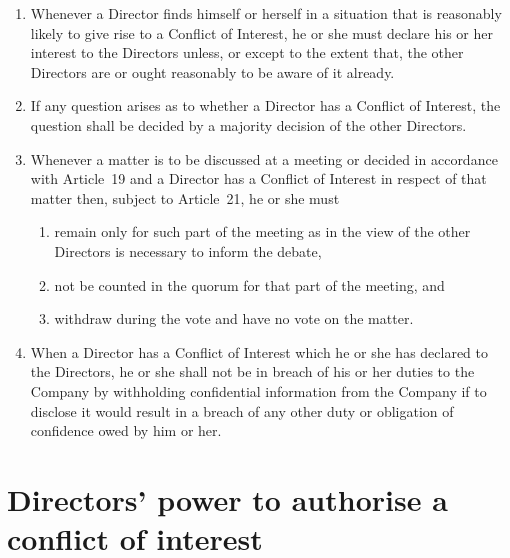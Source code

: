 \documentclass[a4paper,12pt]{article}
\begin{document}
\begin{enumerate}
  \item Whenever a Director finds himself or herself in a situation that is reasonably likely to give rise to a Conflict of Interest, he or she must declare his or her interest to the Directors unless, or except to the extent that, the other Directors are or ought reasonably to be aware of it already.
  \item If any question arises as to whether a Director has a Conflict of Interest, the question shall be decided by a majority decision of the other Directors.
  \item Whenever a matter is to be discussed at a meeting or decided in accordance with Article 19 and a Director has a Conflict of Interest in respect of that matter then, subject to Article 21, he or she must
  \begin{enumerate}
    \item	remain only for such part of the meeting as in the view of the other Directors is necessary to inform the debate,
    \item not be counted in the quorum for that part of the meeting, and
    \item withdraw during the vote and have no vote on the matter.
  \end{enumerate}
  \item	When a Director has a Conflict of Interest which he or she has declared to the Directors, he or she shall not be in breach of his or her duties to the Company by withholding confidential information from the Company if to disclose it would result in a breach of any other duty or obligation of confidence owed by him or her.
\end{enumerate}

\section{Directors’ power to authorise a conflict of interest}
\end{document}
